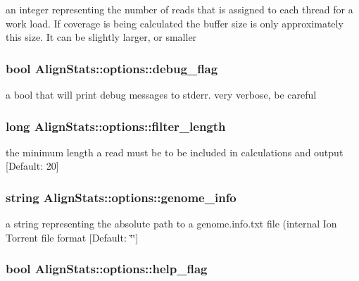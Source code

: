 \label{struct_align_stats_1_1options_aadebe419d97d862d6441d1563367e246}
an integer representing the number of reads that is assigned to each thread for a work load. If coverage is being calculated the buffer size is only approximately this size. It can be slightly larger, or smaller \hypertarget{struct_align_stats_1_1options_ab1d57cdf5b105d06aa184d41af5e4505}{
\subsubsection[{debug\_\-flag}]{\setlength{\rightskip}{0pt plus 5cm}bool {\bf AlignStats::options::debug\_\-flag}}}
\label{struct_align_stats_1_1options_ab1d57cdf5b105d06aa184d41af5e4505}
a bool that will print debug messages to stderr. very verbose, be careful \hypertarget{struct_align_stats_1_1options_a533ba263882d33023b63682a5de8aa62}{
\subsubsection[{filter\_\-length}]{\setlength{\rightskip}{0pt plus 5cm}long {\bf AlignStats::options::filter\_\-length}}}
\label{struct_align_stats_1_1options_a533ba263882d33023b63682a5de8aa62}
the minimum length a read must be to be included in calculations and output \mbox{[}Default: 20\mbox{]} \hypertarget{struct_align_stats_1_1options_ab115525327af943f92ad59b6e00b7747}{
\subsubsection[{genome\_\-info}]{\setlength{\rightskip}{0pt plus 5cm}string {\bf AlignStats::options::genome\_\-info}}}
\label{struct_align_stats_1_1options_ab115525327af943f92ad59b6e00b7747}
a string representing the absolute path to a genome.info.txt file (internal Ion Torrent file format \mbox{[}Default: \char`\"{}\char`\"{}\mbox{]} \hypertarget{struct_align_stats_1_1options_ae9a1d04b390a861656a13bbb9becefcc}{
\subsubsection[{help\_\-flag}]{\setlength{\rightskip}{0pt plus 5cm}bool {\bf AlignStats::options::help\_\-flag}}}
